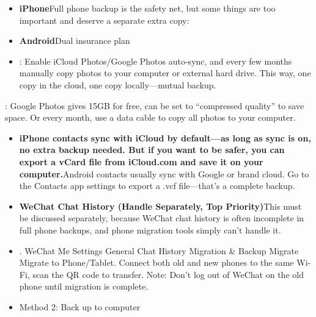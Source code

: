 
\begin{itemize}
  \item \textbf{iPhone}Full phone backup is the safety net, but some things are too important and deserve a separate extra copy:
  \item \textbf{Android}Dual insurance plan
  \item : Enable iCloud Photos/Google Photos auto-sync, and every few months manually copy photos to your computer or external hard drive. This way, one copy in the cloud, one copy locally—mutual backup.
\end{itemize}


: Google Photos gives 15GB for free, can be set to “compressed quality” to save space. Or every month, use a data cable to copy all photos to your computer.


\begin{itemize}
  \item \textbf{iPhone contacts sync with iCloud by default—as long as sync is on, no extra backup needed. But if you want to be safer, you can export a vCard file from iCloud.com and save it on your computer.}Android contacts usually sync with Google or brand cloud. Go to the Contacts app settings to export a .vcf file—that's a complete backup.
  \item \textbf{WeChat Chat History (Handle Separately, Top Priority)}This must be discussed separately, because WeChat chat history is often incomplete in full phone backups, and phone migration tools simply can't handle it.
\end{itemize}


\begin{itemize}
  \item . WeChat Me Settings General Chat History Migration \& Backup Migrate Migrate to Phone/Tablet. Connect both old and new phones to the same Wi-Fi, scan the QR code to transfer. Note: Don't log out of WeChat on the old phone until migration is complete.
  \item Method 2: Back up to computer
\end{itemize}

